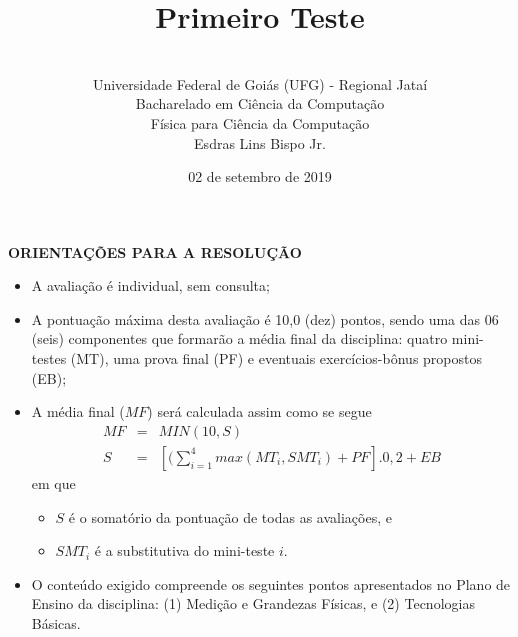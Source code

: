 \documentclass[12pt,a4paper,oneside]{article}
\author{\\Universidade Federal de Goiás (UFG) - Regional Jataí\\Bacharelado em Ciência da Computação \\Física para Ciência da Computação \\Esdras Lins Bispo Jr.}
\title{\sc \huge Primeiro Teste}
\date{02 de setembro de 2019}
\begin{document}
\maketitle

{\bf ORIENTAÇÕES PARA A RESOLUÇÃO}

\footnotesize

\begin{itemize}
	\item A avaliação é individual, sem consulta;
	\item A pontuação máxima desta avaliação é 10,0 (dez) pontos, sendo uma das 06 (seis) componentes que formarão a média final da disciplina: quatro mini-testes (MT), uma prova final (PF) e eventuais exercícios-bônus propostos (EB);
	\item A média final ($MF$) será calculada assim como se segue
	\begin{eqnarray}
	MF & = & MIN(10, S) \nonumber \\
	S & = & [(\sum_{i=1}^{4} max(MT_i, SMT_i ) + PF].0,2  + EB \nonumber
	\end{eqnarray}
	em que 
	\begin{itemize}
		\item $S$ é o somatório da pontuação de todas as avaliações, e
		\item $SMT_i$ é a substitutiva do mini-teste $i$.
	\end{itemize}
	\item O conteúdo exigido compreende os seguintes pontos apresentados no Plano de Ensino da disciplina: (1) Medição e Grandezas Físicas, e (2) Tecnologias Básicas.
\end{itemize}


\begin{center}
\end{center}

\newpage

\normalsize
\end{document}
